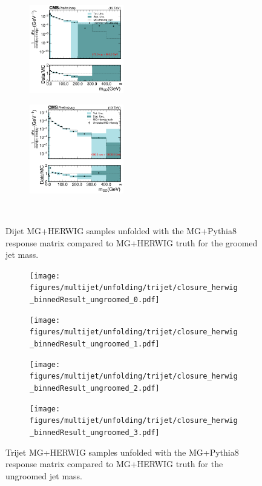 \begin{figure}[htp!]
\begin{subfigure}
          \centering
          \includegraphics[width=0.45\textwidth]{figures/multijet/unfolding/dijet/closure_herwig_binnedResult_groomed_3.pdf}
        \end{subfigure}
        \begin{subfigure}
          \centering
          \includegraphics[width=0.45\textwidth]{figures/multijet/unfolding/dijet/closure_herwig_binnedResult_groomed_4.pdf}
        \end{subfigure}\\
	\caption{Dijet MG+HERWIG samples unfolded with the MG+Pythia8 response matrix compared to MG+HERWIG truth for the groomed jet mass.}
	\label{fig:dijetherwigclosurebinned_g}
      \end{figure}
      
      \begin{figure}[htp!]
	\centering
	\begin{subfigure}
          \centering
          \texttt{[image: figures/multijet/unfolding/trijet/closure\_herwig\_binnedResult\_ungroomed\_0.pdf]}
        \end{subfigure}%
        \begin{subfigure}
          \centering
          \texttt{[image: figures/multijet/unfolding/trijet/closure\_herwig\_binnedResult\_ungroomed\_1.pdf]}
        \end{subfigure}%
        \begin{subfigure}
          \centering
          \texttt{[image: figures/multijet/unfolding/trijet/closure\_herwig\_binnedResult\_ungroomed\_2.pdf]}
        \end{subfigure}%
        \begin{subfigure}
          \centering
          \texttt{[image: figures/multijet/unfolding/trijet/closure\_herwig\_binnedResult\_ungroomed\_3.pdf]}
        \end{subfigure}
        \caption{Trijet MG+HERWIG samples unfolded with the MG+Pythia8 response matrix compared to MG+HERWIG truth for the ungroomed jet mass.}
	\label{fig:trijetherwigclosurebinned_u}
      \end{figure}

